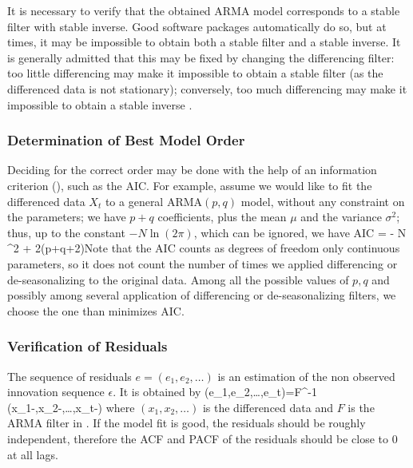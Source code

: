 It is necessary to verify that the obtained ARMA model
corresponds to a stable filter with stable inverse.
Good software packages automatically do so, but at
times, it may be impossible to obtain both a stable
filter and a stable inverse. It is generally admitted
that this may be fixed by changing the differencing
filter: too little differencing may make it impossible
to obtain a stable filter (as the differenced data is
not stationary); conversely, too much differencing may
make it impossible to obtain a stable inverse
\cite{BrockwellDavis02-book}.

\subsubsection{Determination of Best Model Order}
Deciding for the correct order may be done with the
help of an information criterion (), such
as the AIC. For example, assume we would like to fit
the differenced data $X_t$ to a general ARMA$(p,q)$
model, without any constraint on the parameters; we
have $p+q$ coefficients, plus the mean $\mu$ and the
variance $\sigma^2$; thus, up to the constant $- N \ln
(2 \pi)$, which can be ignored, we have \be \mbox{AIC}
= - N \ln \hat{\sigma}^2 + 2(p+q+2)\ee Note that the
AIC counts as degrees of freedom only continuous
parameters, so it does not count the number of times
we applied differencing or de-seasonalizing to the
original data. Among all the possible values of $p,q$
and possibly among several application of differencing
or de-seasonalizing filters, we choose the one than
minimizes AIC.

\subsubsection{Verification of Residuals} The sequence
of residuals $e=(e_1,e_2,\ldots)$ is an estimation of
the non observed innovation sequence $\epsilon$. It is
obtained by
 \be
(e_1,e_2,\ldots,e_t)=F^{-1}
(x_1-\mu,x_2-\mu,\ldots,x_t-\mu) \label{eq-diff-resid}
 \ee
where $(x_1,x_2,\ldots)$ is the differenced data and
$F$ is the ARMA filter in . If the
model fit is good, the residuals should be roughly
independent, therefore the ACF and PACF of the
residuals should be close to 0 at all lags.

